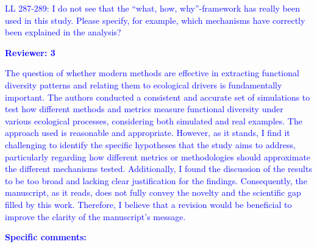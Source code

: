 \documentclass[
]{article}
\begin{document}
\textcolor{blue}{LL 287-289: I do not see that the ``what, how, why''-framework has really been used in this study.
Please specify, for example, which mechanisms have correctly been explained in the analysis?}

\textcolor{blue}{\textbf{Reviewer: 3}}

\textcolor{blue}{The question of whether modern methods are effective in extracting functional diversity patterns and relating them to ecological drivers is fundamentally important.
The authors conducted a consistent and accurate set of simulations to test how different methods and metrics measure functional diversity under various ecological processes, considering both simulated and real examples.
The approach used is reasonable and appropriate.
However, as it stands, I find it challenging to identify the specific hypotheses that the study aims to address, particularly regarding how different metrics or methodologies should approximate the different mechanisms tested.
Additionally, I found the discussion of the results to be too broad and lacking clear justification for the findings.
Consequently, the manuscript, as it reads, does not fully convey the novelty and the scientific gap filled by this work.
Therefore, I believe that a revision would be beneficial to improve the clarity of the manuscript's message.}

\textcolor{blue}{\textbf{Specific comments:}}
\end{document}
